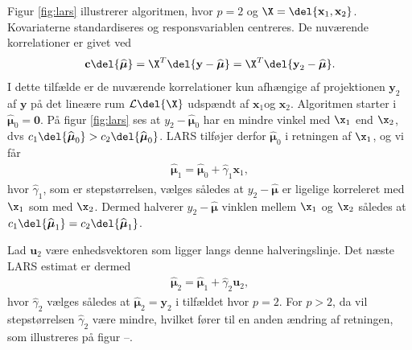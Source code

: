 Figur \ref{fig:lars} illustrerer algoritmen, hvor $p = 2$ og $\X = \del{\textbf{x}_1, \textbf{x}_2}$. 
Kovariaterne standardiseres og responsvariablen centreres.
De nuværende korrelationer er givet ved 
\begin{align*}
\textbf{c}\del{\boldsymbol{\widehat{\mu}}} = \X^T\del{\textbf{y} - \widehat{\boldsymbol{\mu}}} = \X^T \del{ \textbf{y}_2 - \boldsymbol{\widehat{\mu}}}.
\end{align*}
I dette tilfælde er de nuværende korrelationer kun afhængige af projektionen $\textbf{y}_2$ af $\textbf{y}$ på det lineære rum $\mathcal{L} \del{\X}$ udspændt af $ \textbf{x}_1 $og $\textbf{x}_2$. 
Algoritmen starter i $\widehat{\boldsymbol{\mu}}_0 = \textbf{0}$.
På figur \ref{fig:lars} ses at \(y_2 - \widehat{\boldsymbol{\mu}}_0\) har en mindre vinkel med \(\x_1\) end \(\x_2\), dvs \(c_1 \del{\widehat{\boldsymbol{\mu}}_0} > c_2 \del{\widehat{\boldsymbol{\mu}}_0}\).
LARS tilføjer derfor \(\widehat{\boldsymbol{\mu}}_0\) i retningen af \(\x_1\), og vi får
\begin{align*}
\boldsymbol{\widehat{\mu}}_1 = \boldsymbol{\widehat{\mu}}_0 + \widehat{\gamma}_1 \textbf{x}_1,
\end{align*}
hvor \(\widehat{\gamma}_1\), som er stepstørrelsen, vælges således at \(y_2 - \boldsymbol{\widehat{\mu}}\) er ligelige korreleret med \(\x_1\) som med \(\x_2\).
Dermed halverer \(y_2 - \widehat{\boldsymbol{\mu}}\) vinklen mellem \(\x_1\) og \(\x_2\) således at \(c_1 \del{\widehat{\boldsymbol{\mu}}_1} = c_2 \del{\widehat{\boldsymbol{\mu}}_1}\).

Lad $\mathbf{u}_2$ være enhedsvektoren som ligger langs denne halveringslinje.
Det næste LARS estimat er dermed
\begin{align*}
\widehat{\boldsymbol{\mu}}_2 = \widehat{\boldsymbol{\mu}}_1+ \widehat{\gamma}_2 \mathbf{u}_2,
\end{align*}
hvor $\widehat{\gamma}_2$ vælges således at $\widehat{\boldsymbol{\mu}}_2 = \textbf{y}_2$ i tilfældet hvor $p = 2$. 
For \(p>2\), da vil stepstørrelsen \(\widehat{\gamma}_2\) være mindre, hvilket fører til en anden ændring af retningen, som illustreres på figur --.


